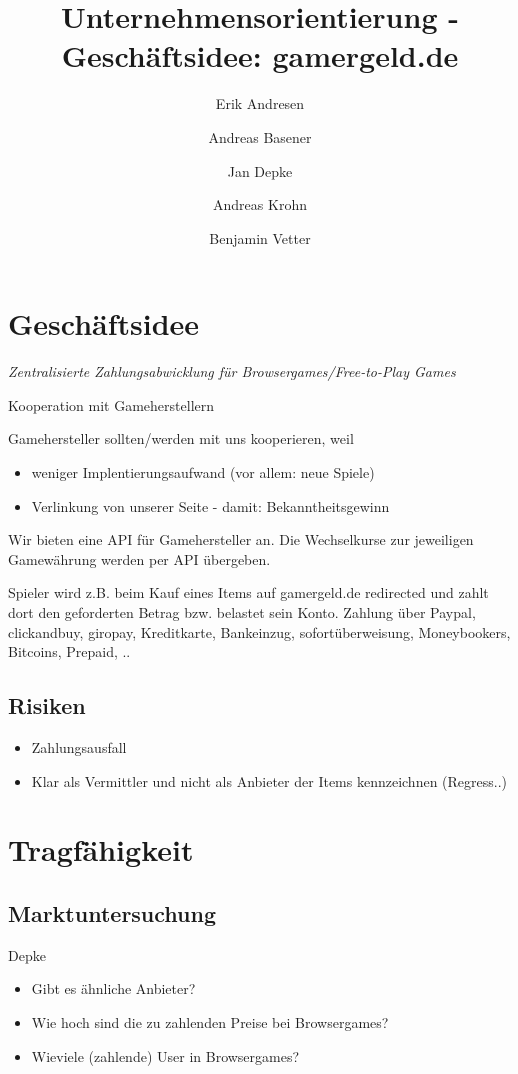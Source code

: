 \documentclass[a4paper,10pt]{article}
\title{Unternehmensorientierung - Geschäftsidee: gamergeld.de}
\author{Erik Andresen \and Andreas Basener \and Jan Depke \and Andreas Krohn \and Benjamin Vetter}
\begin{document}
\maketitle

\section{Geschäftsidee}
\emph{Zentralisierte Zahlungsabwicklung für Browsergames/Free-to-Play Games}

Kooperation mit Gameherstellern

Gamehersteller sollten/werden mit uns kooperieren, weil
\begin{itemize}
  \item weniger Implentierungsaufwand (vor allem: neue Spiele)
  \item Verlinkung von unserer Seite - damit: Bekanntheitsgewinn
\end{itemize}

Wir bieten eine API für Gamehersteller an.
Die Wechselkurse zur jeweiligen Gamewährung werden per API übergeben.

Spieler wird z.B. beim Kauf eines Items auf gamergeld.de redirected und zahlt dort den geforderten Betrag bzw. belastet sein Konto.
Zahlung über Paypal, clickandbuy, giropay, Kreditkarte, Bankeinzug, sofortüberweisung, Moneybookers, Bitcoins, Prepaid, ..

\subsection{Risiken}
\begin{itemize}
  \item Zahlungsausfall
  \item Klar als Vermittler und nicht als Anbieter der Items kennzeichnen (Regress..)
\end{itemize}

\section{Tragfähigkeit}

\subsection{Marktuntersuchung}
Depke
\begin{itemize}
  \item Gibt es ähnliche Anbieter?
  \item Wie hoch sind die zu zahlenden Preise bei Browsergames?
  \item Wieviele (zahlende) User in Browsergames?
\end{itemize}
\end{document}
